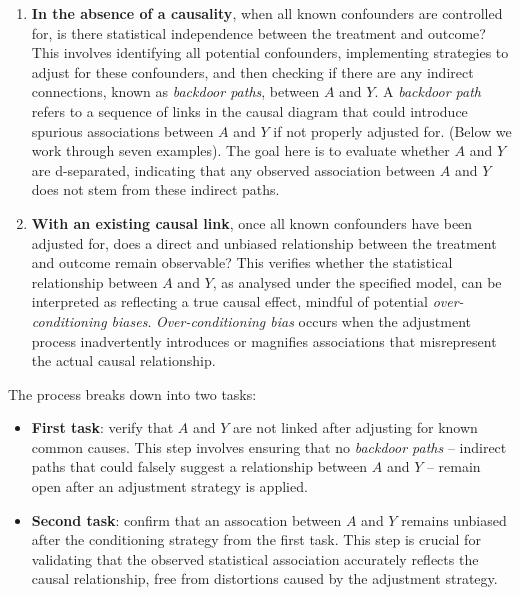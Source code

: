 \documentclass[
  singlecolumn]{article}
\begin{document}
\begin{enumerate}
\def\labelenumi{\arabic{enumi}.}
\item
  \textbf{In the absence of a causality}, when all known confounders are
  controlled for, is there statistical independence between the
  treatment and outcome? This involves identifying all potential
  confounders, implementing strategies to adjust for these confounders,
  and then checking if there are any indirect connections, known as
  \emph{backdoor paths}, between \(A\) and \(Y\). A \emph{backdoor path}
  refers to a sequence of links in the causal diagram that could
  introduce spurious associations between \(A\) and \(Y\) if not
  properly adjusted for. (Below we work through seven examples). The
  goal here is to evaluate whether \(A\) and \(Y\) are d-separated,
  indicating that any observed association between \(A\) and \(Y\) does
  not stem from these indirect paths.
\item
  \textbf{With an existing causal link}, once all known confounders have
  been adjusted for, does a direct and unbiased relationship between the
  treatment and outcome remain observable? This verifies whether the
  statistical relationship between \(A\) and \(Y\), as analysed under
  the specified model, can be interpreted as reflecting a true causal
  effect, mindful of potential \emph{over-conditioning biases}.
  \emph{Over-conditioning bias} occurs when the adjustment process
  inadvertently introduces or magnifies associations that misrepresent
  the actual causal relationship.
\end{enumerate}

The process breaks down into two tasks:

\begin{itemize}
\item
  \textbf{First task}: verify that \(A\) and \(Y\) are not linked after
  adjusting for known common causes. This step involves ensuring that no
  \emph{backdoor paths} -- indirect paths that could falsely suggest a
  relationship between \(A\) and \(Y\) -- remain open after an
  adjustment strategy is applied.
\item
  \textbf{Second task}: confirm that an assocation between \(A\) and
  \(Y\) remains unbiased after the conditioning strategy from the first
  task. This step is crucial for validating that the observed
  statistical association accurately reflects the causal relationship,
  free from distortions caused by the adjustment strategy.
\end{itemize}
\end{document}
